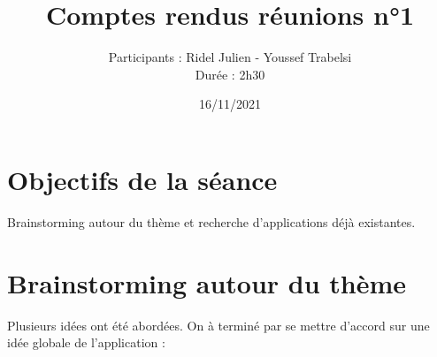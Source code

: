 \documentclass{article}
\title{\Huge Comptes rendus réunions n°1}
\author{Participants : Ridel Julien - Youssef Trabelsi \\ Durée : 2h30}
\date{16/11/2021}
\begin{document}
\maketitle

\section{\huge Objectifs de la séance}

\Large Brainstorming autour du thème et recherche d’applications déjà existantes.

\section{\huge Brainstorming autour du thème} 

\Large Plusieurs idées ont été abordées. On à terminé par se mettre d’accord sur une idée globale de l’application : \\
\end{document}
